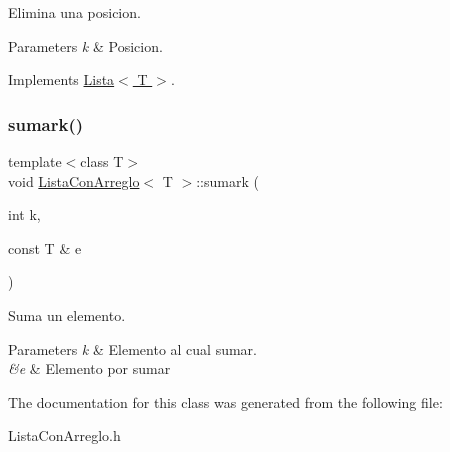 Elimina una posicion. 


\begin{DoxyParams}{Parameters}
{\em k} & Posicion. \\
\hline
\end{DoxyParams}


Implements \hyperlink{class_lista}{Lista$<$ T $>$}.

\hypertarget{class_lista_con_arreglo_abff25d43f812199b55bb34df9084c9ac}{}\label{class_lista_con_arreglo_abff25d43f812199b55bb34df9084c9ac} 
\subsubsection{\texorpdfstring{sumark()}{sumark()}}
{\ttfamily template$<$class T$>$ \\
void \hyperlink{class_lista_con_arreglo}{Lista\+Con\+Arreglo}$<$ T $>$\+::sumark (\begin{DoxyParamCaption}\item[{int}]{k,  }\item[{const T \&}]{e }\end{DoxyParamCaption})\hspace{0.3cm}{\ttfamily [inline]}}



Suma un elemento. 


\begin{DoxyParams}{Parameters}
{\em k} & Elemento al cual sumar. \\
\hline
{\em \&e} & Elemento por sumar \\
\hline
\end{DoxyParams}


The documentation for this class was generated from the following file\+:\begin{DoxyCompactItemize}
\item 
Lista\+Con\+Arreglo.\+h\end{DoxyCompactItemize}
